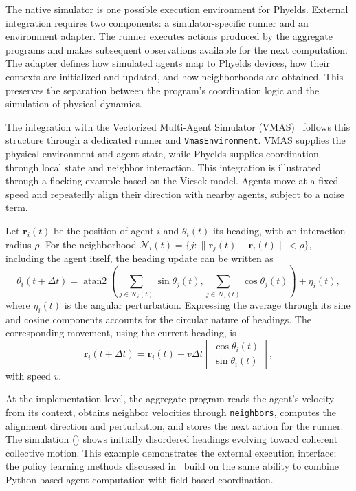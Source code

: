 The native simulator is one possible execution environment for Phyelds.
%
External integration requires two components: a simulator-specific runner
 and an environment adapter.
%
The runner executes actions produced by the aggregate programs and makes
 subsequent observations available for the next computation.
%
The adapter defines how simulated agents map to Phyelds devices, how their
 contexts are initialized and updated, and how neighborhoods are obtained.
%
This preserves the separation between the program's coordination logic and
 the simulation of physical dynamics.

The integration with the Vectorized Multi-Agent Simulator (VMAS)~\cite{DBLP:conf/dars/BettiniKBP22} 
 follows this structure through a dedicated runner and \texttt{VmasEnvironment}.
%
VMAS supplies the physical environment and agent state, while Phyelds
 supplies coordination through local state and neighbor interaction.
%
This integration is illustrated through a flocking example
 based on the Vicsek model.
%
Agents move at a fixed speed and repeatedly align their direction with
 nearby agents, subject to a noise term.

Let $\mathbf{r}_i(t)$ be the position of agent $i$ and $\theta_i(t)$ its
 heading, with an interaction radius $\rho$.
%
For the neighborhood
 $\mathcal{N}_i(t)=\{j : \|\mathbf{r}_j(t)-\mathbf{r}_i(t)\|<\rho\}$,
 including the agent itself, the heading update can be written as
\begin{equation}
  \theta_i(t+\Delta t)=
  \operatorname{atan2}\!\left(
    \sum_{j\in\mathcal{N}_i(t)}\sin\theta_j(t),
    \sum_{j\in\mathcal{N}_i(t)}\cos\theta_j(t)
  \right)+\eta_i(t),
  \label{eq:phyelds-vicsek-heading}
\end{equation}
where $\eta_i(t)$ is the angular perturbation.
%
Expressing the average through its sine and cosine components accounts for
 the circular nature of headings.
%
The corresponding movement, using the current heading, is
\begin{equation}
  \mathbf{r}_i(t+\Delta t)=\mathbf{r}_i(t)+v\Delta t
  \begin{bmatrix}
    \cos\theta_i(t)\\
    \sin\theta_i(t)
  \end{bmatrix},
  \label{eq:phyelds-vicsek-position}
\end{equation}
with speed $v$.

At the implementation level, the aggregate program reads the agent's
 velocity from its context, obtains neighbor velocities through
 \texttt{neighbors}, computes the alignment direction and perturbation,
 and stores the next action for the runner.
%
The simulation () shows initially disordered headings
 evolving toward coherent collective motion.
%
This example demonstrates the external execution interface; the policy
 learning methods discussed in~ build on the same
 ability to combine Python-based agent computation with field-based coordination.

